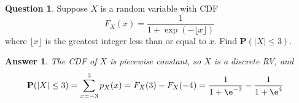 \documentclass[utf8]{article}
\theoremstyle{definition}%
\newtheorem{question}{Question} %
\theoremstyle{plain}%
\newtheorem{answer}{Answer} %
\begin{document}
\begin{question}
    Suppose $X$ is a random variable with CDF
    \begin{equation}
        F_{X}(x) = \frac{1}{1 + \exp(-\lfloor x \rfloor)}
    \end{equation}
    where $\lfloor x \rfloor$ is the greatest integer less than or equal to $x$. Find $\mathbf{P}(|X| \leq 3)$.
\end{question}
\begin{answer}
    The CDF of $X$ is piecewise constant, so $X$ is a discrete RV, and 
    \begin{equation}
    \begin{aligned}
        \mathbf{P}(|X| \leq 3) &= \sum_{x=-3}^{3}p_{X}(x) = F_{X}(3) - F_{X}(-4) = \frac{1}{1 + \e^{-3}} - \frac{1}{1 + \e^{4}}
    \end{aligned}
    \end{equation}
\end{answer}
\end{document}
